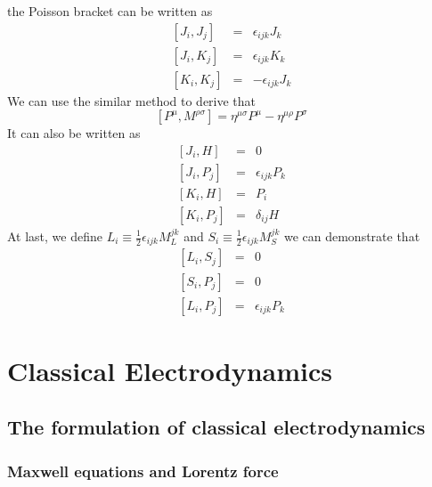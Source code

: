 \documentclass[cyan]{elegantnote}
\begin{document}
the Poisson bracket can be written as
\begin{eqnarray}
	\left[J_i,J_j\right] &=& \epsilon_{ijk}J_k \nonumber \\
	\left[J_i,K_j\right] &=& \epsilon_{ijk}K_k \nonumber \\
	\left[K_i,K_j\right] &=& -\epsilon_{ijk}J_k \nonumber
\end{eqnarray}
We can use the similar method to derive that
\[[P^{\mu},M^{\rho \sigma}] = \eta^{\mu \sigma}P^{\mu} - \eta^{\mu \rho}P^{\sigma}\]
It can also be written as
\begin{eqnarray}
	\left[J_i,H\right] &=& 0 \nonumber \\
	\left[J_i,P_j\right] &=& \epsilon_{ijk}P_k \nonumber \\
	\left[K_i,H\right] &=& P_i \nonumber \\
	\left[K_i,P_j\right] &=& \delta_{ij}H \nonumber
\end{eqnarray}
At last, we define $L_i \equiv \frac{1}{2} \epsilon_{ijk} M_L^{jk}$ and $S_i \equiv \frac{1}{2} \epsilon_{ijk} M_S^{jk}$
we can demonstrate that
\begin{eqnarray}
	\left[L_i,S_j\right] &=& 0 \nonumber \\
	\left[S_i,P_j\right] &=& 0 \nonumber \\
	\left[L_i,P_j\right] &=& \epsilon_{ijk}P_k \nonumber
\end{eqnarray}

\chapter{Classical Electrodynamics}
\section{The formulation of classical electrodynamics}
\subsection{Maxwell equations and Lorentz force}
\end{document}
